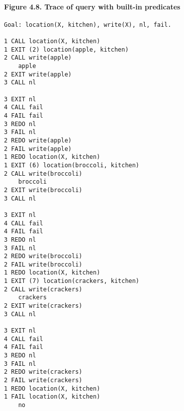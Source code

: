 
\paragraph{Figure 4.8. Trace of query with built-in predicates}
\begin{verbatim}
Goal: location(X, kitchen), write(X), nl, fail.

1 CALL location(X, kitchen)
1 EXIT (2) location(apple, kitchen)
2 CALL write(apple)
    apple
2 EXIT write(apple)
3 CALL nl

3 EXIT nl
4 CALL fail
4 FAIL fail
3 REDO nl
3 FAIL nl
2 REDO write(apple)
2 FAIL write(apple)
1 REDO location(X, kitchen)
1 EXIT (6) location(broccoli, kitchen)
2 CALL write(broccoli)
    broccoli
2 EXIT write(broccoli)
3 CALL nl

3 EXIT nl
4 CALL fail
4 FAIL fail
3 REDO nl
3 FAIL nl
2 REDO write(broccoli)
2 FAIL write(broccoli)
1 REDO location(X, kitchen)
1 EXIT (7) location(crackers, kitchen)
2 CALL write(crackers)
    crackers
2 EXIT write(crackers)
3 CALL nl

3 EXIT nl
4 CALL fail
4 FAIL fail
3 REDO nl
3 FAIL nl
2 REDO write(crackers)
2 FAIL write(crackers)
1 REDO location(X, kitchen)
1 FAIL location(X, kitchen)
    no
\end{verbatim}

     
\secup
